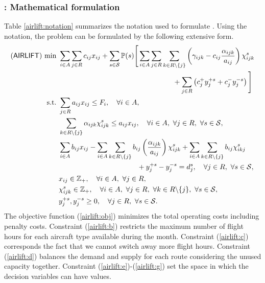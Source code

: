 \subsubsection{\airlift: Mathematical formulation}
Table \ref{airlift:notation} summarizes the notation used to formulate \airlift. Using the notation, the problem can be formulated by the following extensive form.
\begin{subequations} \label{airlift:formulation}
	\begin{align}
	(\textsf{AIRLIFT})\ \textrm{min}\ &\sum_{i\in A}\sum_{j\in R} c_{ij}x_{ij}+\sum_{s\in\mathcal{S}}\operatorname*{\mathbb{P}}(s)\Bigg[ \sum_{i\in A}\sum_{j\in R}\sum_{k\in R\backslash \{j\} }\left( \gamma_{ijk}-c_{ij}\frac{\alpha_{ijk}}{a_{ij}} \right)\chi_{ijk}^s \nonumber \\ 
	&\qquad\qquad\qquad\qquad\qquad\qquad\qquad\qquad+\sum_{j\in R}\left( c_j^+ y_j^{+s}+c_j^- y_j^{-s} \right)\Bigg]\label{airlift:obj} \\
	\textrm{s.t.}\ & \sum_{j\in R}a_{ij}x_{ij}\le F_i,\quad\forall i\in A,	\label{airlift:b}\\
	&\sum_{k\in R\backslash\{j\}}\alpha_{ijk}\chi_{ijk}^s\le a_{ij}x_{ij},\quad\forall i\in A,\ \forall j\in R,\ \forall s\in\mathcal{S}, \label{airlift:c}\\
	&\sum_{i\in A}b_{ij}x_{ij}-\sum_{i\in A}\sum_{k\in R\backslash\{j\}}b_{ij}\left(\frac{\alpha_{ijk}}{a_{ij}}\right)\chi_{ijk}^s + \sum_{i\in A}\sum_{k\in R\backslash\{j\}}b_{ij}\chi_{ikj}^s \nonumber \\
	&\qquad\qquad\qquad\qquad\qquad\quad+ y_j^{+s} - y_j^{-s} = d_j^s,\quad \forall j\in R,\ \forall s\in\mathcal{S}, \label{airlift:d}\\
	&x_{ij}\in\mathbb{Z}_+,\quad\forall i\in A,\ \forall j\in R, \label{airlift:e}\\
	&\chi_{ijk}^s\in\mathbb{Z}_+,\quad\forall i\in A,\ \forall j\in R,\ \forall k\in R\backslash\{j\},\ \forall s\in\mathcal{S}, \label{airlift:f}\\
	& y_j^{+s},y_j^{-s}\ge 0,\quad\forall j\in R,\ \forall s\in\mathcal{S}.\label{airlift:g}
	\end{align}
\end{subequations}
The objective function (\ref{airlift:obj}) minimizes the total operating costs including penalty costs. Constraint (\ref{airlift:b}) restricts the maximum number of flight hours for each aircraft type available during the month. Constraint (\ref{airlift:c}) corresponds the fact that we cannot switch away more flight hours. Constraint (\ref{airlift:d}) balances the demand and supply for each route considering the unused capacity together. Constraint (\ref{airlift:e})-(\ref{airlift:g}) set the space in which the decision variables can have values.

